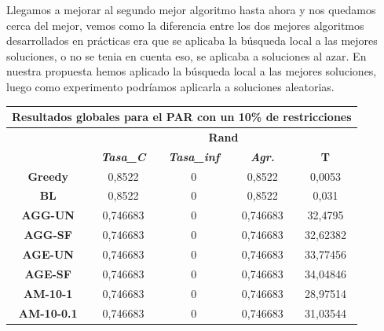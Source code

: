 \documentclass[12pt, spanish]{article}
\begin{document}
Llegamos a mejorar al segundo mejor algoritmo hasta ahora y nos quedamos cerca del mejor, vemos como la diferencia entre los dos mejores algoritmos desarrollados en prácticas era que se aplicaba la búsqueda local a las mejores soluciones, o no se tenia en cuenta eso, se aplicaba a soluciones al azar. En nuestra propuesta hemos aplicado la búsqueda local a las mejores soluciones, luego como experimento podríamos aplicarla a soluciones aleatorias.

\begin{table}[H]
\centering
\begin{tabular}{|c|c|c|c|c|}
\hline
\multicolumn{5}{|c|}{\textbf{Resultados globales para el PAR con un 10\% de restricciones}}                                 \\ \hline
\multirow{2}{*}{}           & \multicolumn{4}{c|}{\textbf{Rand}}                                                            \\ \cline{2-5} 
                            & \textit{\textbf{Tasa\_C}} & \textit{\textbf{Tasa\_inf}} & \textit{\textbf{Agr.}} & \textbf{T} \\ \hline
\textbf{Greedy}             & 0,8522                    & 0                           & 0,8522                 & 0,0053     \\ \hline
\textbf{BL}                 & 0,8522                    & 0                           & 0,8522                 & 0,031      \\ \hline
\textbf{AGG-UN}             & 0,746683                  & 0                           & 0,746683               & 32,4795    \\ \hline
\textbf{AGG-SF}             & 0,746683                  & 0                           & 0,746683               & 32,62382   \\ \hline
\textbf{AGE-UN}             & 0,746683                  & 0                           & 0,746683               & 33,77456   \\ \hline
\textbf{AGE-SF}             & 0,746683                  & 0                           & 0,746683               & 34,04846   \\ \hline
\textbf{AM-10-1}            & 0,746683                  & 0                           & 0,746683               & 28,97514   \\ \hline
\textbf{AM-10-0.1}          & 0,746683                  & 0                           & 0,746683               & 31,03544   \\ \hline

\end{tabular}
\end{table}
\end{document}
